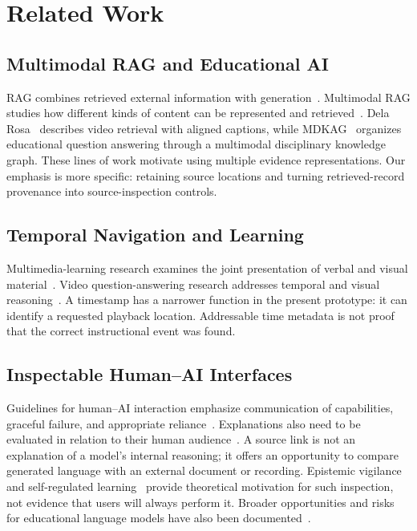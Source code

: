 \documentclass[manuscript,screen,nonacm]{acmart}
\begin{document}
\section{Related Work}
\subsection{Multimodal RAG and Educational AI}
RAG combines retrieved external information with generation~\cite{lewis2020rag}. Multimodal RAG studies how different kinds of content can be represented and retrieved~\cite{hu2025mrag}. Dela Rosa~\cite{delarosa2025video} describes video retrieval with aligned captions, while MDKAG~\cite{zhao2025mdkag} organizes educational question answering through a multimodal disciplinary knowledge graph. These lines of work motivate using multiple evidence representations. Our emphasis is more specific: retaining source locations and turning retrieved-record provenance into source-inspection controls.

\subsection{Temporal Navigation and Learning}
Multimedia-learning research examines the joint presentation of verbal and visual material~\cite{mayer2020multimedia}. Video question-answering research addresses temporal and visual reasoning~\cite{zhong2022video}. A timestamp has a narrower function in the present prototype: it can identify a requested playback location. Addressable time metadata is not proof that the correct instructional event was found.

\subsection{Inspectable Human--AI Interfaces}
Guidelines for human--AI interaction emphasize communication of capabilities, graceful failure, and appropriate reliance~\cite{amershi2019guidelines}. Explanations also need to be evaluated in relation to their human audience~\cite{miller2019explanation}. A source link is not an explanation of a model's internal reasoning; it offers an opportunity to compare generated language with an external document or recording. Epistemic vigilance~\cite{sperber2010vigilance} and self-regulated learning~\cite{zimmerman2002self} provide theoretical motivation for such inspection, not evidence that users will always perform it. Broader opportunities and risks for educational language models have also been documented~\cite{kasneci2023chatgpt}.
\end{document}
